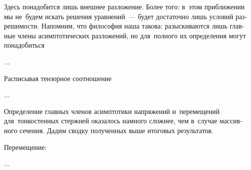 

\begin{otherlanguage}{russian}

Здесь понадобится лишь внешнее разложение. Более того: в~этом приближении мы не~будем искать решения уравнений~--- будет достаточно лишь условий разрешимости. Напомним, что философия наша такова: разыскиваются лишь главные члены асимптотических разложений, но для~полного их определения могут понадобиться

...



\end{otherlanguage}



\begin{otherlanguage}{russian}

Расписывая тензорное соотношение

...



\end{otherlanguage}



\begin{otherlanguage}{russian}

Определение главных членов асимптотики напряжений и~перемещений для~тонкостенных стержней оказалось намного сложнее, чем в~случае массивного сечения. Дадим сводку полученных выше итоговых результатов.

Перемещение:

...




\end{otherlanguage}

